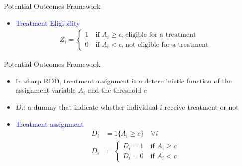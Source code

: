 \documentclass[dvipsnames,hyperref={pdfpagelabels=false}]{beamer}
\begin{document}
\begin{frame}{Potential Outcomes Framework}{}
	\begin{itemize}
		
		\item \textcolor{blue}{Treatment Eligibility}
		\begin{align*}
			Z_{i}=\left\lbrace
			\begin{array}{l}
				1\quad \text{if $A_i\geq c$, eligible for a treatment}\\
				0\quad \text{if $A_i< c$, not eligible for a treatment}
			\end{array}\right.
		\end{align*}
		
	\end{itemize}
\end{frame}


\begin{frame}{Potential Outcomes Framework}{}
	
	\begin{itemize} 
		
		
		\item In sharp RDD, treatment assignment is a deterministic function of the assignment variable $A_{i}$ and the threshold $c$	
		\vspace{0.2cm}
		\item $D_i$: a dummy that indicate whether individual $i$ receive treatment or not
		\vspace{0.2cm}
		\item \textcolor{blue}{Treatment assignment}
		\begin{align*}
			D_i&=1\{A_i\geq c\} \quad \forall i \\  
			D_i&=\left\lbrace
			\begin{array}{l}
				D_i=1\quad \text{if $A_i\geq c$}\\
				D_i=0\quad \text{if $A_i<c$}
			\end{array}\right.
		\end{align*}
		
	\end{itemize}
\end{frame}
\end{document}
